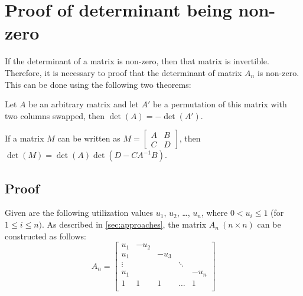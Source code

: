 \chapter{Proof of determinant being non-zero} \label{ch:proof}
If the determinant of a matrix is non-zero, then that matrix is invertible. Therefore, it is necessary to proof that the determinant of matrix $A_n$ is non-zero. This can be done using the following two theorems:
\begin{theorem} \label{th:swap}
Let $A$ be an arbitrary matrix and let $A'$ be a permutation of this matrix with two columns swapped, then $\det(A) = - \det(A')$.
\end{theorem}
\begin{theorem} \label{th:block}
If a matrix $M$ can be written as $M = \begin{bmatrix}
A & B \\ 
C & D 
\end{bmatrix}$, then $\det(M) = \det(A) \det(D - C A^{-1} B)$.
\end{theorem}

\section{Proof}
Given are the following utilization values $u_1$, $u_2$, \dots, $u_n$, where $0 < u_i \leq 1$ (for $1 \leq i \leq n)$. As described in \autoref{sec:approaches}, the matrix $A_n~(n \times n)$ can be constructed as follows:
\begin{equation}
    A_n = 
\begin{bmatrix}
    u_1    & -u_2 &       &        & \\
    u_1    &      &  -u_3 &        & \\
    \vdots &      &       & \ddots & \\
    u_1    &      &       &        & -u_n \\
    1      & 1    & 1     & \dots  & 1 \\
\end{bmatrix}
\end{equation}

